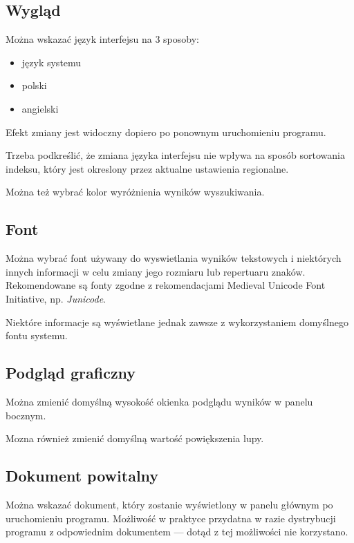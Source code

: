 \documentclass{mwart}
\begin{document}
\subsection{Wygląd}
\label{sec:wygld}

Można wskazać język interfejsu na 3 sposoby:
\begin{itemize}
\item język systemu
\item polski
\item angielski
\end{itemize}
Efekt zmiany jest widoczny dopiero po ponownym uruchomieniu programu.

Trzeba podkreślić, że zmiana języka interfejsu nie wpływa na sposób
sortowania indeksu, który jest okreslony przez aktualne ustawienia
regionalne.

Można też wybrać kolor wyróżnienia wyników wyszukiwania.

\subsection{Font}
\label{sec:font}

Można wybrać font używany do wyswietlania wyników tekstowych i
niektórych innych informacji w celu zmiany jego rozmiaru lub
repertuaru znaków. Rekomendowane są fonty zgodne z rekomendacjami
Medieval Unicode Font Initiative, np. \textsl{Junicode}.

Niektóre informacje są wyświetlane jednak zawsze z wykorzystaniem
domyślnego fontu systemu.

\subsection{Podgląd graficzny}
\label{sec:podgld-graficzny}

Można zmienić domyślną wysokość okienka podglądu wyników w panelu
bocznym.

Mozna również zmienić domyślną wartość powiększenia lupy.

\subsection{Dokument powitalny}
\label{sec:dokument-powitalny}

Można wskazać dokument, który zostanie wyświetlony w panelu głównym po
uruchomieniu programu. Możliwość w praktyce przydatna w razie
dystrybucji programu z odpowiednim dokumentem --- dotąd z tej
możliwości nie korzystano.
\end{document}
